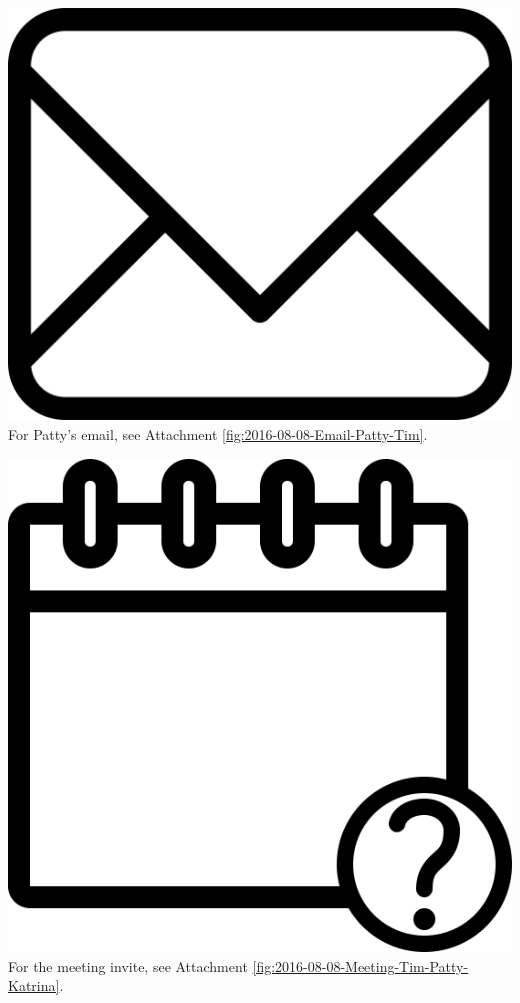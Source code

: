 \documentclass{article}
\begin{document}
\vspace{2em}
\noindent\includegraphics[height=\fontcharht\font`\B]{icons/attachment-email} For Patty's email, see Attachment \ref{fig:2016-08-08-Email-Patty-Tim}.
\vspace{2em}

\vspace{2em}
\noindent\includegraphics[height=\fontcharht\font`\B]{icons/attachment-calendar} For the meeting invite, see Attachment \ref{fig:2016-08-08-Meeting-Tim-Patty-Katrina}.
\vspace{2em}
\end{document}
